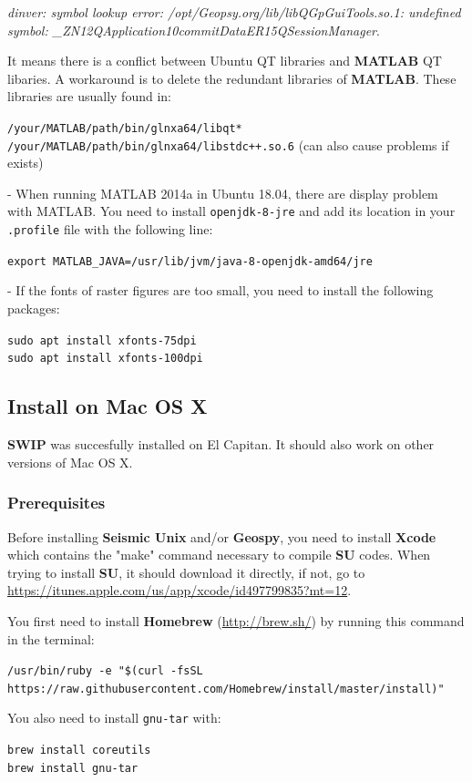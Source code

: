 \documentclass[twoside,a4paper]{article}
\def\SWIP{\textbf{SWIP}}
\def\SU{\textbf{SU}}
\def\SeismicUnix{\textbf{Seismic Unix}}
\def\Geopsy{\textbf{Geospy}}
\def\MATLAB{\textbf{MATLAB}}
\begin{document}
\textit{dinver: symbol lookup error: /opt/Geopsy.org/lib/libQGpGuiTools.so.1: undefined symbol: \_ZN12QApplication10commitDataER15QSessionManager}.

It means there is a conflict between Ubuntu QT libraries and {\MATLAB} QT libaries. A workaround is to delete the redundant libraries of {\MATLAB}. These libraries are usually found in:

\verb|/your/MATLAB/path/bin/glnxa64/libqt*|\\
\verb|/your/MATLAB/path/bin/glnxa64/libstdc++.so.6| (can also cause problems if exists)

- When running MATLAB 2014a in Ubuntu 18.04, there are display problem with MATLAB. You need to install \verb|openjdk-8-jre| and add its location in your \verb|.profile| file with the following line:

\verb|export MATLAB_JAVA=/usr/lib/jvm/java-8-openjdk-amd64/jre|

- If the fonts of raster figures are too small, you need to install the following packages:

\verb|sudo apt install xfonts-75dpi|\\
\verb|sudo apt install xfonts-100dpi|

\clearpage
\subsection{Install on Mac OS X}
{\SWIP} was succesfully installed on El Capitan. It should also work on other versions of Mac OS X.
\subsubsection{Prerequisites}
Before installing {\SeismicUnix} and/or {\Geopsy}, you need to install \textbf{Xcode} which contains the "make" command necessary to compile {\SU} codes. When trying to install {\SU}, it should download it directly, if not, go to \url{https://itunes.apple.com/us/app/xcode/id497799835?mt=12}.

You first need to install \textbf{Homebrew} (\url{http://brew.sh/}) by running this command in the terminal:

\verb|/usr/bin/ruby -e "$(curl -fsSL https://raw.githubusercontent.com/Homebrew/install/master/install)"|

You also need to install \verb|gnu-tar| with:

\verb|brew install coreutils|\\
\verb|brew install gnu-tar|
\end{document}
